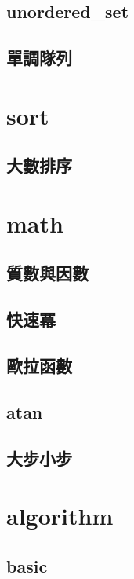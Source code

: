     \subsection{unordered\_set}
        
    \subsection{單調隊列}
        

\section{sort}
    \subsection{大數排序}
        

\section{math}
        \subsection{質數與因數}
              
        \subsection{快速冪}
            
        \subsection{歐拉函數}
            
        \subsection{atan}
            
        \subsection{大步小步}
            
        
\section{algorithm}
    \subsection{basic}
        
